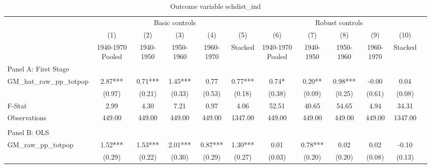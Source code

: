  \begin{table}[htbp]\centering {} \begin{threeparttable} \caption{Outcome variable schdist\_ind} \begin{tabular}{l*{11}{c}} \toprule
          &\multicolumn{5}{c}{Basic controls}                                   &\multicolumn{5}{c}{Robust controls}                                  \\\cmidrule(lr){2-6}\cmidrule(lr){7-11}
          &\multicolumn{1}{c}{(1)}&\multicolumn{1}{c}{(2)}&\multicolumn{1}{c}{(3)}&\multicolumn{1}{c}{(4)}&\multicolumn{1}{c}{(5)}&\multicolumn{1}{c}{(6)}&\multicolumn{1}{c}{(7)}&\multicolumn{1}{c}{(8)}&\multicolumn{1}{c}{(9)}&\multicolumn{1}{c}{(10)}\\
          &\multicolumn{1}{c}{1940-1970 Pooled}&\multicolumn{1}{c}{1940-1950}&\multicolumn{1}{c}{1950-1960}&\multicolumn{1}{c}{1960-1970}&\multicolumn{1}{c}{Stacked}&\multicolumn{1}{c}{1940-1970 Pooled}&\multicolumn{1}{c}{1940-1950}&\multicolumn{1}{c}{1950-1960}&\multicolumn{1}{c}{1960-1970}&\multicolumn{1}{c}{Stacked}\\
\cmidrule(lr){1-11}
\multicolumn{10}{l}{Panel A: First Stage}\\
\cmidrule(lr){1-11}
GM\_hat\_raw\_pp\_totpop&      2.87***&      0.71***&      1.45***&      0.77   &      0.77***&      0.74*  &      0.20** &      0.98***&     -0.00   &      0.04   \\
          &    (0.97)   &    (0.21)   &    (0.33)   &    (0.53)   &    (0.18)   &    (0.38)   &    (0.09)   &    (0.25)   &    (0.61)   &    (0.08)   \\
\midrule
F-Stat    &      2.99   &      4.30   &      7.21   &      0.97   &      4.06   &     52.51   &     40.65   &     54.65   &      4.94   &     34.31   \\
Observations&    449.00   &    449.00   &    449.00   &    449.00   &   1347.00   &    449.00   &    449.00   &    449.00   &    449.00   &   1347.00   \\
\cmidrule[\heavyrulewidth](lr){1-11} \\ \cmidrule[\heavyrulewidth](lr){1-11}
\multicolumn{10}{l}{Panel B: OLS}\\
\cmidrule(lr){1-11}
GM\_raw\_pp\_totpop&      1.52***&      1.53***&      2.01***&      0.87***&      1.30***&      0.01   &      0.78***&      0.02   &      0.02   &     -0.10   \\
          &    (0.29)   &    (0.22)   &    (0.30)   &    (0.29)   &    (0.27)   &    (0.03)   &    (0.20)   &    (0.20)   &    (0.08)   &    (0.13)   \\

\end{tabular}
\end{threeparttable}
\end{table}
